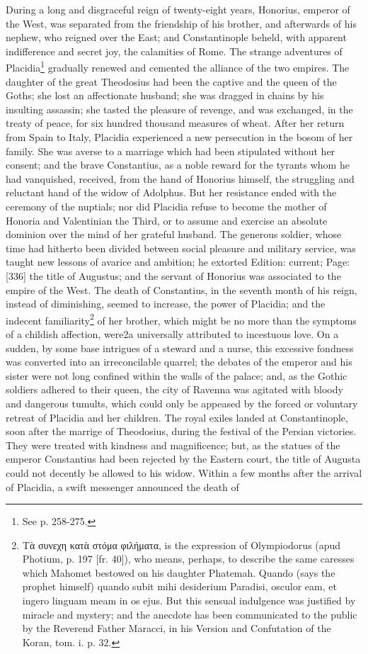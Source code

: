 During a long and disgraceful reign of twenty-eight years, Honorius, emperor of the West, was separated from the friendship of his brother, and afterwards of his nephew, who reigned over the East; and Constantinople beheld, with apparent indifference and secret joy, the calamities of Rome. The strange adventures of Placidia\footnote{See p. 258-275.} gradually renewed and cemented the alliance of the two empires. The daughter of the great Theodosius had been the captive and the queen of the Goths; she lost an affectionate husband; she was dragged in chains by his insulting assassin; she tasted the pleasure of revenge, and was exchanged, in the treaty of peace, for six hundred thousand measures of wheat. After her return from Spain to Italy, Placidia experienced a new persecution in the bosom of her family. She was averse to a marriage which had been stipulated without her consent; and the brave Constantius, as a noble reward for the tyrants whom he had vanquished, received, from the hand of Honorius himself, the struggling and reluctant hand of the widow of Adolphus. But her resistance ended with the ceremony of the nuptials; nor did Placidia refuse to become the mother of Honoria and Valentinian the Third, or to assume and exercise an absolute dominion over the mind of her grateful husband. The generous soldier, whose time had hitherto been divided between social pleasure and military service, was taught new lessons of avarice and ambition; he extorted Edition: current; Page: [336] the title of Augustus; and the servant of Honorius was associated to the empire of the West. The death of Constantius, in the seventh month of his reign, instead of diminishing, seemed to increase, the power of Placidia; and the indecent familiarity\footnote{\textgreek{Τ\texthebrew{ὰ} συνεχη κατ\texthebrew{ὰ} στόμα φιλήματα}, is the expression of Olympiodorus (apud Photium, p. 197 [fr. 40]), who means, perhaps, to describe the same caresses which Mahomet bestowed on his daughter Phatemah. Quando (says the prophet himself) quando subit mihi desiderium Paradisi, osculor eam, et ingero linguam meam in os ejus. But this sensual indulgence was justified by miracle and mystery; and the anecdote has been communicated to the public by the Reverend Father Maracci, in his Version and Confutation of the Koran, tom. i. p. 32.} of her brother, which might be no more than the symptoms of a childish affection, were2a universally attributed to incestuous love. On a sudden, by some base intrigues of a steward and a nurse, this excessive fondness was converted into an irreconcilable quarrel; the debates of the emperor and his sister were not long confined within the walls of the palace; and, as the Gothic soldiers adhered to their queen, the city of Ravenna was agitated with bloody and dangerous tumults, which could only be appeased by the forced or voluntary retreat of Placidia and her children. The royal exiles landed at Constantinople, soon after the marrige of Theodosius, during the festival of the Persian victories. They were treated with kindness and magnificence; but, as the statues of the emperor Constantius had been rejected by the Eastern court, the title of Augusta could not decently be allowed to his widow. Within a few months after the arrival of Placidia, a swift messenger announced the death of 